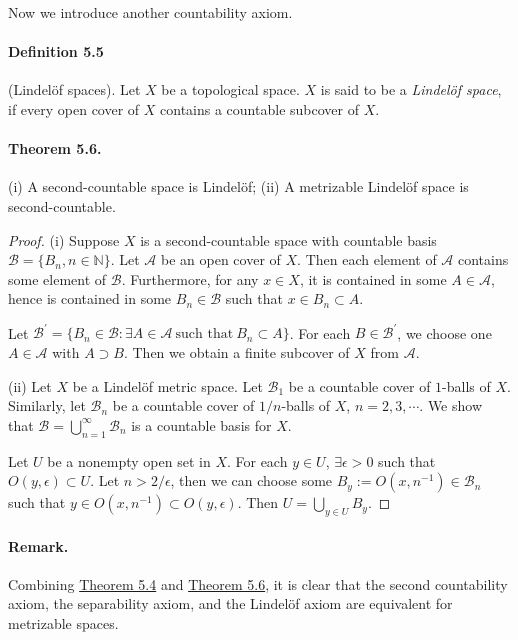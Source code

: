 \documentclass{article}
\numberwithin{equation}{section}
\theoremstyle{plain}
\theoremstyle{definition}
\begin{document}
Now we introduce another countability axiom.

\paragraph{Definition 5.5\label{def:5.5}} (Lindelöf spaces). Let $X$ be a topological space. $X$ is said to be a \textit{Lindelöf space}, if every open cover of $X$ contains a countable subcover of $X$.

\paragraph{Theorem 5.6.\label{thm:5.6}} (i) A second-countable space is Lindelöf; (ii) A metrizable Lindelöf space is second-countable.
\begin{proof}
(i) Suppose $X$ is a second-countable space with countable basis $\mathscr{B}=\{B_n,n\in\mathbb{N}\}$. Let $\mathscr{A}$ be an open cover of $X$. Then each element of $\mathscr{A}$ contains some element of $\mathscr{B}$. Furthermore, for any $x\in X$, it is contained in some $A\in\mathscr{A}$, hence is contained in some $B_n\in\mathscr{B}$ such that $x\in B_n\subset A$.

Let $\mathscr{B}^\prime = \{B_n\in\mathscr{B}:\exists A\in\mathscr{A}\ \text{such that}\ B_n\subset A\}$. For each $B\in\mathscr{B}^\prime$, we choose one $A\in\mathscr{A}$ with $A\supset B$. Then we obtain a finite subcover of $X$ from $\mathscr{A}$.

(ii) Let $X$ be a Lindelöf metric space. Let $\mathscr{B}_1$ be a countable cover of $1$-balls of $X$. Similarly, let $\mathscr{B}_n$ be a countable cover of $1/n$-balls of $X$, $n=2,3,\cdots$. We show that $\mathscr{B}=\bigcup_{n=1}^\infty\mathscr{B}_n$ is a countable basis for $X$.

Let $U$ be a nonempty open set in $X$. For each $y\in U$, $\exists\epsilon > 0$ such that $O(y,\epsilon)\subset U$. Let $n > 2/\epsilon$, then we can choose some $B_y:=O(x,n^{-1})\in\mathscr{B}_n$ such that $y\in O(x,n^{-1})\subset O(y,\epsilon)$. Then $U=\bigcup_{y\in U}B_y$.
\end{proof}

\paragraph{Remark.} Combining \hyperref[thm:5.4]{Theorem 5.4} and \hyperref[thm:5.6]{Theorem 5.6}, it is clear that the second countability axiom, the separability axiom, and the Lindelöf axiom are equivalent for metrizable spaces.
\end{document}
